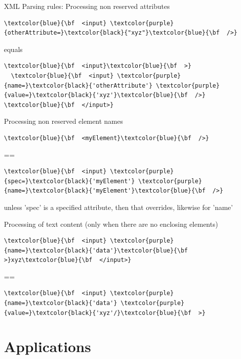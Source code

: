 \documentclass{beamer}
\theoremstyle{definition}
\begin{document}
\begin{frame}[containsverbatim]
{\Large XML}
Parsing rules:
Processing non reserved attributes
\begin{Verbatim}[commandchars=\\\{\}]
\textcolor{blue}{\bf  <input} \textcolor{purple}{otherAttribute=}\textcolor{black}{"xyz"}\textcolor{blue}{\bf  />}
\end{Verbatim}
equals
\begin{Verbatim}[commandchars=\\\{\}]
\textcolor{blue}{\bf  <input}\textcolor{blue}{\bf  >}
  \textcolor{blue}{\bf  <input} \textcolor{purple}{name=}\textcolor{black}{'otherAttribute'} \textcolor{purple}{value=}\textcolor{black}{'xyz'}\textcolor{blue}{\bf  />}
\textcolor{blue}{\bf  </input>}
\end{Verbatim}

Processing non reserved element names
\begin{Verbatim}[commandchars=\\\{\}]
\textcolor{blue}{\bf  <myElement}\textcolor{blue}{\bf  />}
\end{Verbatim}
==
\begin{Verbatim}[commandchars=\\\{\}]
\textcolor{blue}{\bf  <input} \textcolor{purple}{spec=}\textcolor{black}{'myElement'} \textcolor{purple}{name=}\textcolor{black}{'myElement'}\textcolor{blue}{\bf  />}
\end{Verbatim}
unless 'spec' is a specified attribute, then that overrides, likewise for 'name' 


Processing of text content (only when there are no enclosing elements)
\begin{Verbatim}[commandchars=\\\{\}]
\textcolor{blue}{\bf  <input} \textcolor{purple}{name=}\textcolor{black}{'data'}\textcolor{blue}{\bf  >}xyz\textcolor{blue}{\bf  </input>}
\end{Verbatim}
==
\begin{Verbatim}[commandchars=\\\{\}]
\textcolor{blue}{\bf  <input} \textcolor{purple}{name=}\textcolor{black}{'data'} \textcolor{purple}{value=}\textcolor{black}{'xyz'/}\textcolor{blue}{\bf  >}
\end{Verbatim}
\end{frame}


\section{Applications}
\end{document}
